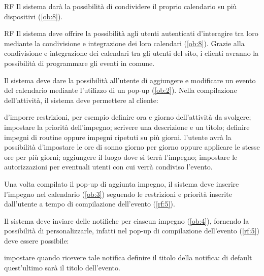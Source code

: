 \begin{listaPersonale}{RF}
	 Il sistema darà la possibilità di condividere il proprio calendario su più dispositivi (\ref{ob:8}).

	\begin{listaPersonale2}{RF}
		 Il sistema deve offrire la possibilità agli utenti autenticati d'interagire tra loro mediante la condivisione e integrazione dei loro calendari (\ref{ob:8}). Grazie alla condivisione e integrazione dei calendari tra gli utenti del sito, i clienti avranno la possibilità di programmare gli eventi in comune.
	\end{listaPersonale2}

	 Il sistema deve dare la possibilità all'utente di aggiungere e modificare un evento del calendario mediante l'utilizzo di un pop-up (\ref{ob:2}). Nella compilazione dell'attività, il sistema deve permettere al cliente:
	\begin{listaPersonale2}{}
		 d'imporre restrizioni, per esempio definire ora e giorno dell'attività da svolgere;
		 impostare la priorità dell'impegno;
		 scrivere una descrizione e un titolo;
		 definire impegni di routine oppure impegni ripetuti su più giorni.
		 l'utente avrà la possibilità d'impostare le ore di sonno giorno per giorno oppure applicare le stesse ore per più giorni;
		 aggiungere il luogo dove si terrà l'impegno;
		 impostare le autorizzazioni per eventuali utenti con cui verrà condiviso l'evento.
	\end{listaPersonale2}


	 Una volta compilato il pop-up di aggiunta impegno, il sistema deve inserire l'impegno nel calendario (\ref{ob:3}) seguendo le restrizioni e priorità inserite dall'utente a tempo di compilazione dell'evento (\ref{rf:5}).

	 Il sistema deve inviare delle notifiche per ciascun impegno (\ref{ob:4}), fornendo la possibilità di personalizzarle, infatti nel pop-up di compilazione dell'evento (\ref{rf:5}) deve essere possibile:
	\begin{listaPersonale2}{}
		 impostare quando ricevere tale notifica
		 definire il titolo della notifica: di default quest'ultimo sarà il titolo dell'evento.
	\end{listaPersonale2}


\end{listaPersonale}
